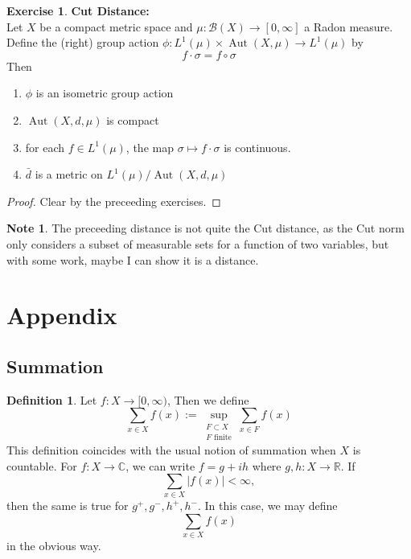 \documentclass[12pt]{amsart}
\theoremstyle{definition}
\newtheorem{defn}[definition]{Definition}
\newtheorem{note}[definition]{Note}
\newtheorem{ex}[definition]{Exercise}
\newcommand{\sig}{\sigma}
\newcommand{\C}{\mathbb{C}}
\newcommand{\R}{\mathbb{R}}
\newcommand{\MB}{\mathcal{B}}
\newcommand{\RG}{[0,\infty]}
\newcommand{\Rg}{[0,\infty)}
\DeclareMathOperator{\Aut}{Aut}
\newcommand{\lex}[1]{\label{ex:#1}}
\newcommand{\ld}[1]{\label{defn:#1}}
\begin{document}
	\begin{ex} \lex{} \textbf{Cut Distance:} \\
	Let $X$ be a compact metric space and $\mu:\MB(X) \rightarrow \RG$ a Radon measure. Define the (right) group action $\phi: L^1(\mu) \times \Aut(X, \mu) \rightarrow L^1(\mu) $ by 
	$$f \cdot \sig = f \circ \sig$$	
	Then 
	\begin{enumerate}
	\item $\phi$ is an isometric group action 
	\item $\Aut(X, d, \mu)$ is compact 
	\item for each $f \in L^1(\mu)$, the map $\sig \mapsto  f \cdot \sig$ is continuous.  
	\item $\bar{d}$ is a metric on $L^1(\mu) / \Aut(X, d, \mu)$
	\end{enumerate}
	\end{ex}
	
	\begin{proof}
	Clear by the preceeding exercises.
	\end{proof}
	
	\begin{note}
	The preceeding distance is not quite the Cut distance, as the Cut norm only considers a subset of measurable sets for a function of two variables, but with some work, maybe I can show it is a distance.
	\end{note}
	
	
	
	
	
	
	
	
	
	
	
	\newpage
	\section{Appendix}
	
	\subsection{Summation}
	
	\begin{defn} \ld{}
		Let $f:X \rightarrow \Rg$, Then we define $$\sum_{x \in X} f(x) := \sup_{\substack{F \subset X \\ F \text{ finite}}} \sum_{x \in F} f(x)$$ This definition coincides with the usual notion of summation when $X$ is countable. For $f:X \rightarrow \C$, we can write $f = g +ih$ where $g,h:X \rightarrow \R$. If $$\sum_{x \in X}|f(x)| < \infty,$$ then the same is true for $g^+,g^-,h^+,h^-$. In this case, we may define $$\sum_{x \in X} f(x)$$ in the obvious way.
	\end{defn} 
	
\end{document}
